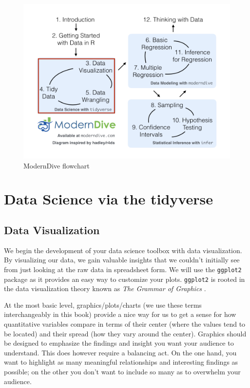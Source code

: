 \documentclass[12pt, krantz2,]{krantz}
\begin{document}
\begin{figure}

{\centering \includegraphics[width=1.1\linewidth]{images/flowcharts/flowchart/flowchart.004} 

}

\caption{ModernDive flowchart}\label{fig:unnamed-chunk-16}
\end{figure}

\hypertarget{part-data-science-via-the-tidyverse}{%
\part{Data Science via the tidyverse}\label{part-data-science-via-the-tidyverse}}

\hypertarget{viz}{%
\chapter{Data Visualization}\label{viz}}

We begin the development of your data science toolbox with data visualization. By visualizing our data, we gain valuable insights that we couldn't initially see from just looking at the raw data in spreadsheet form. We will use the \texttt{ggplot2} package as it provides an easy way to customize your plots. \texttt{ggplot2} is rooted in the data visualization theory known as \emph{The Grammar of Graphics} \citep{wilkinson2005}.

At the most basic level, graphics/plots/charts (we use these terms interchangeably in this book) provide a nice way for us to get a sense for how quantitative variables compare in terms of their center (where the values tend to be located) and their spread (how they vary around the center). Graphics should be designed to emphasize the findings and insight you want your audience to understand. This does however require a balancing act. On the one hand, you want to highlight as many meaningful relationships and interesting findings as possible; on the other you don't want to include so many as to overwhelm your audience.
\end{document}
